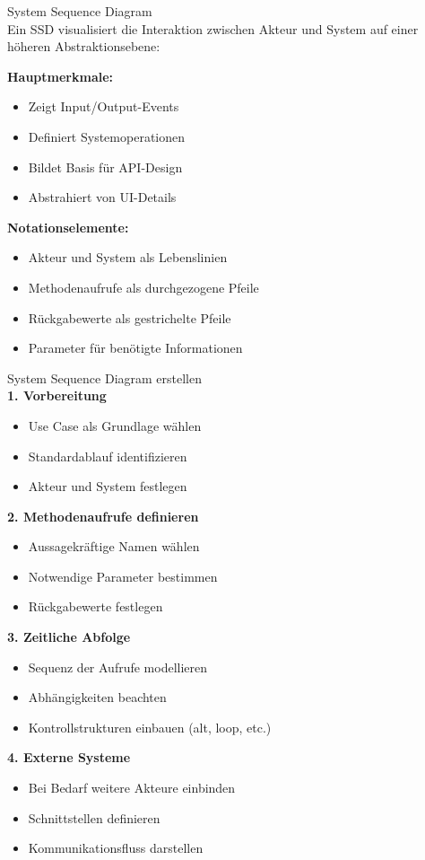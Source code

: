\begin{concept}{System Sequence Diagram}\\
Ein SSD visualisiert die Interaktion zwischen Akteur und System auf einer höheren Abstraktionsebene:

\textbf{Hauptmerkmale:}
\begin{itemize}
    \item Zeigt Input/Output-Events
    \item Definiert Systemoperationen
    \item Bildet Basis für API-Design
    \item Abstrahiert von UI-Details
\end{itemize}

\textbf{Notationselemente:}
\begin{itemize}
    \item Akteur und System als Lebenslinien
    \item Methodenaufrufe als durchgezogene Pfeile
    \item Rückgabewerte als gestrichelte Pfeile
    \item Parameter für benötigte Informationen
\end{itemize}
\end{concept}

\begin{KR}{System Sequence Diagram erstellen}\\
\textbf{1. Vorbereitung}
\begin{itemize}
    \item Use Case als Grundlage wählen
    \item Standardablauf identifizieren
    \item Akteur und System festlegen
\end{itemize}

\textbf{2. Methodenaufrufe definieren}
\begin{itemize}
    \item Aussagekräftige Namen wählen
    \item Notwendige Parameter bestimmen
    \item Rückgabewerte festlegen
\end{itemize}

\textbf{3. Zeitliche Abfolge}
\begin{itemize}
    \item Sequenz der Aufrufe modellieren
    \item Abhängigkeiten beachten
    \item Kontrollstrukturen einbauen (alt, loop, etc.)
\end{itemize}

\textbf{4. Externe Systeme}
\begin{itemize}
    \item Bei Bedarf weitere Akteure einbinden
    \item Schnittstellen definieren
    \item Kommunikationsfluss darstellen
\end{itemize}
\end{KR}

